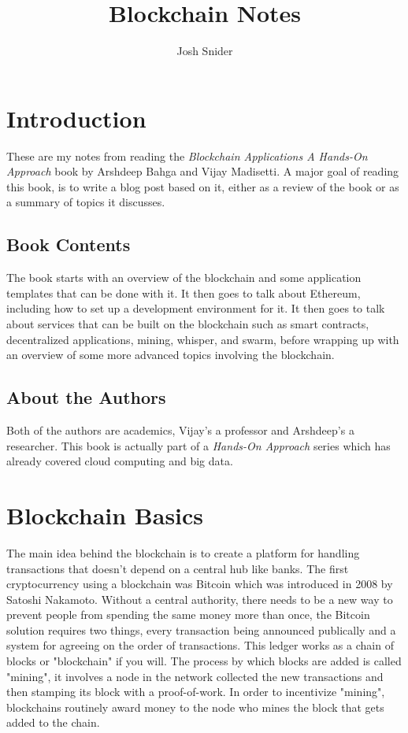 \documentclass{article}
\begin{document}
\title{Blockchain Notes}
\author{Josh Snider}

\maketitle


\section{Introduction}
These are my notes from reading the \textit{Blockchain Applications A Hands-On Approach} book by Arshdeep Bahga and Vijay Madisetti. A major goal of reading this book, is to write a blog post based on it, either as a review of the book or as a summary of topics it discusses.

\subsection{Book Contents}
The book starts with an overview of the blockchain and some application templates that can be done with it. It then goes to talk about Ethereum, including how to set up a development environment for it. It then goes to talk about services that can be built on the blockchain such as smart contracts, decentralized applications, mining, whisper, and swarm, before wrapping up with an overview of some more advanced topics involving the blockchain.

\subsection{About the Authors}

Both of the authors are academics, Vijay's a professor and Arshdeep's a researcher. This book is actually part of a \textit{Hands-On Approach} series which has already covered cloud computing and big data.

\section{Blockchain Basics}

The main idea behind the blockchain is to create a platform for handling transactions that doesn't depend on a central hub like banks. The first cryptocurrency using a blockchain was Bitcoin which was introduced in 2008 by Satoshi Nakamoto. Without a central authority, there needs to be a new way to prevent people from spending the same money more than once, the Bitcoin solution requires two things, every transaction being announced publically and a system for agreeing on the order of transactions. This ledger works as a chain of blocks or "blockchain" if you will. The process by which blocks are added is called "mining", it involves a node in the network collected the new transactions and then stamping its block with a proof-of-work. In order to incentivize "mining", blockchains routinely award money to the node who mines the block that gets added to the chain.
\end{document}
